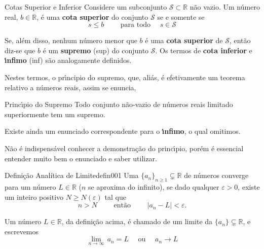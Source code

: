 \begin{defic}{Cotas Superior e Inferior}{}
Considere um subconjunto $\mathcal{S}\subset \mathbb{R}$ n\~{a}o vazio.
Um n\'{u}mero real, $b\in \mathbb{R}$, \'{e} uma \textbf{cota superior} do conjunto $
\mathcal{S}$ se e somente se
\begin{equation*}
  s\leq b \qquad \text{ para todo }\quad s\in \mathcal{S}
\end{equation*}
\end{defic}

Se, al\'{e}m disso, nenhum n\'{u}mero menor que $b$ \'{e} uma \textbf{cota
superior} de $\mathcal{S}$, ent\~{a}o diz-se que $b$ \'{e} um
\textbf{supremo} (sup) do conjunto  $ \mathcal{S}$. Os termos de
\textbf{cota inferior} e \textbf{\'{\i}nfimo} (inf) s\~{a}o analogamente
definidos.


Nestes termos, o pr\'{\i}ncipio do supremo, que, ali\'{a}s, \'{e} efetivamente
um teorema relativo a n\'{u}meros reais, assim se enuncia,

\begin{theoc}{Princ\'{\i}pio do Supremo}{}
Todo conjunto n\~{a}o-vazio de n\'{u}meros reais limitado superiormente tem
um supremo.
\end{theoc}

Existe ainda um enunciado correspondente para o \textbf{\'{\i}nfimo}, o
qual omitimos.
\begin{obs}
 N\~{a}o \'{e} indispens\'{a}vel conhecer a demonstra\c{c}\~{a}o do princ\'{\i}pio, por\'{e}m \'{e}
essencial entender muito bem o enunciado e saber utilizar.
\end{obs}

\begin{defic}{Definição Analítica de Limite}{defin001}
Uma \seq $\{a_n\}_{n\geq 1} \subsetneq \mathbb{R}$ de n\'{u}meros  converge para um n\'{u}mero  $L\in \mathbb{R}$ ($n$ se aproxima do infinito), se dado qualquer $\varepsilon>0$, existe um inteiro positivo $N\geq N(\varepsilon)$ tal que
\begin{equation}\label{imp01}
n>N\qquad  \text{ ent\~{a}o }\qquad |a_n-L|<\varepsilon.
\end{equation}
\end{defic}

Um n\'{u}mero $L\in \mathbb{R}$, da defini\c{c}\~{a}o acima, \'{e} chamado de um limite da \seq $\{a_n\}\subsetneq \mathbb{R}$, e escrevemos
\begin{equation*}
\lim_{n\to\infty}\,a_n=L\quad \text{ ou }\quad a_n\to L
\end{equation*}


